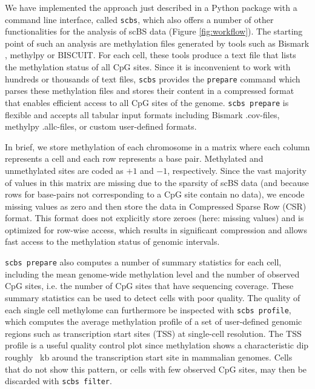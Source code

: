 \documentclass[twocolumn,10pt]{article}
\begin{document}
We have implemented the approach just described in a Python package with a command line interface, called \texttt{scbs}, which also offers a number of other functionalities for the analysis of scBS data (Figure \ref{fig:workflow}).
The starting point of such an analysis are methylation files generated by tools such as Bismark \citep{bismark}, methylpy \citep{methylpy} or BISCUIT.
For each cell, these tools produce a text file that lists the methylation status of all CpG sites.
Since it is inconvenient to work with hundreds or thousands of text files, \texttt{scbs} provides the \texttt{prepare} command which parses these methylation files and stores their content in a compressed format that enables efficient access to all CpG sites of the genome.
\texttt{scbs prepare} is flexible and accepts all tabular input formats including Bismark .cov-files, methylpy .allc-files, or custom user-defined formats.

In brief, we store methylation of each chromosome in a matrix where each column represents a cell and each row represents a base pair.
Methylated and unmethylated sites are coded as $+1$ and $-1$, respectively.
Since the vast majority of values in this matrix are missing due to the sparsity of scBS data (and because rows for base-pairs not corresponding to a CpG site contain no data), we encode missing values as zero and then store the data in Compressed Sparse Row (CSR) format.
This format does not explicitly store zeroes (here: missing values) and is optimized for row-wise access, which results in significant compression and allows fast access to the methylation status of genomic intervals.

\texttt{scbs prepare} also computes a number of summary statistics for each cell, including the mean genome-wide methylation level and the number of observed CpG sites, i.e.
the number of CpG sites that have sequencing coverage.
These summary statistics can be used to detect cells with poor quality.
The quality of each single cell methylome can furthermore be inspected with \texttt{scbs profile}, which computes the average methylation profile of a set of user-defined genomic regions such as transcription start sites (TSS) at single-cell resolution.
The TSS profile is a useful quality control plot since methylation shows a characteristic dip roughly ~kb around the transcription start site in mammalian genomes.
Cells that do not show this pattern, or cells with few observed CpG sites, may then be discarded with \texttt{scbs filter}.
\end{document}
